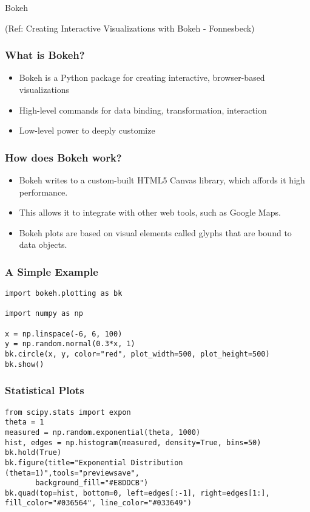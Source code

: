 \begin{frame}[fragile]\frametitle{}
\begin{center}
{\Large Bokeh}

(Ref: Creating Interactive Visualizations with Bokeh - Fonnesbeck)
\end{center}
\end{frame}

\begin{frame}[fragile] \frametitle{What is Bokeh?}
\begin{itemize}
\item Bokeh is a Python package for creating interactive, browser-based visualizations
\item High-level commands for data binding, transformation, interaction
\item Low-level power to deeply customize
\end{itemize}
\end{frame}

\begin{frame}[fragile] \frametitle{How does Bokeh work?}
\begin{itemize}
\item Bokeh writes to a custom-built HTML5 Canvas library, which affords it high performance. 
\item This allows it to integrate with other web tools, such as Google Maps.
\item Bokeh plots are based on visual elements called glyphs that are bound to data objects.
\end{itemize}
\end{frame}

\begin{frame}[fragile] \frametitle{A Simple Example}
\begin{lstlisting}
import bokeh.plotting as bk

import numpy as np

x = np.linspace(-6, 6, 100)
y = np.random.normal(0.3*x, 1)
bk.circle(x, y, color="red", plot_width=500, plot_height=500)
bk.show()
\end{lstlisting}
\end{frame}

\begin{frame}[fragile] \frametitle{Statistical Plots}
\begin{lstlisting}
from scipy.stats import expon
theta = 1
measured = np.random.exponential(theta, 1000)
hist, edges = np.histogram(measured, density=True, bins=50)
bk.hold(True)
bk.figure(title="Exponential Distribution (theta=1)",tools="previewsave",
       background_fill="#E8DDCB")
bk.quad(top=hist, bottom=0, left=edges[:-1], right=edges[1:], fill_color="#036564", line_color="#033649")
       
\end{lstlisting}
\end{frame}

